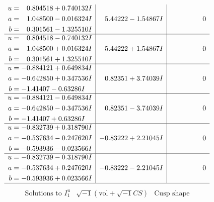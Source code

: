 \documentclass[1p]{elsarticle_modified}
\theoremstyle{definition}
\newcommand{\I}{\sqrt{-1}}
\begin{document}
$$\begin{array}{c|c|c}
\begin{aligned}
u &= \phantom{-}0.804518 + 0.740132 I \\
a &= \phantom{-}1.048500 - 0.016324 I \\
b &= \phantom{-}0.301561 - 1.325510 I\end{aligned}
 & \phantom{-}5.44222 - 1.54867 I & \phantom{-0.000000 } 0 \\ \hline\begin{aligned}
u &= \phantom{-}0.804518 - 0.740132 I \\
a &= \phantom{-}1.048500 + 0.016324 I \\
b &= \phantom{-}0.301561 + 1.325510 I\end{aligned}
 & \phantom{-}5.44222 + 1.54867 I & \phantom{-0.000000 } 0 \\ \hline\begin{aligned}
u &= -0.884121 + 0.649834 I \\
a &= -0.642850 + 0.347536 I \\
b &= -1.41407 - 0.63286 I\end{aligned}
 & \phantom{-}0.82351 + 3.74039 I & \phantom{-0.000000 } 0 \\ \hline\begin{aligned}
u &= -0.884121 - 0.649834 I \\
a &= -0.642850 - 0.347536 I \\
b &= -1.41407 + 0.63286 I\end{aligned}
 & \phantom{-}0.82351 - 3.74039 I & \phantom{-0.000000 } 0 \\ \hline\begin{aligned}
u &= -0.832739 + 0.318790 I \\
a &= -0.537634 - 0.247620 I \\
b &= -0.593936 - 0.023566 I\end{aligned}
 & -0.83222 + 2.21045 I & \phantom{-0.000000 } 0 \\ \hline\begin{aligned}
u &= -0.832739 - 0.318790 I \\
a &= -0.537634 + 0.247620 I \\
b &= -0.593936 + 0.023566 I\end{aligned}
 & -0.83222 - 2.21045 I & \phantom{-0.000000 } 0\\
 \hline 
 \end{array}$$\newpage$$\begin{array}{c|c|c}  
\text{Solutions to }I^u_{1}& \I (\text{vol} + \sqrt{-1}CS) & \text{Cusp shape}\\
 \hline 
\begin{aligned}

\end{aligned}
\end{array}$$
\end{document}

